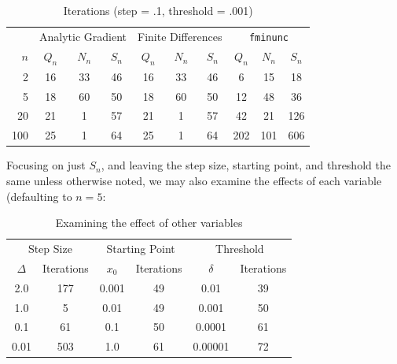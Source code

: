 \documentclass[11pt,letterpaper]{article}
\begin{document}
\begin{table}[h]
\centering
\caption{Iterations (step = .1, threshold = .001)}
\begin{tabular}{r|ccc|ccc|ccc}
   & \multicolumn{3}{|c}{Analytic Gradient} & \multicolumn{3}{|c}{Finite Differences} & \multicolumn{3}{|c}{\texttt{fminunc}} \\
$n$& $Q_n$         & $N_n$        & $S_n$   & $Q_n$              & $N_n$   & $S_n$           & $Q_n$         & $N_n$        & $S_n$ \\\hline
2  & 16            & 33           & 46      & 16                 & 33      & 46              & 6             & 15           & 18    \\
5  & 18            & 60           & 50      & 18                 & 60      & 50              & 12            & 48           & 36    \\
20 & 21            &  1           & 57      & 21                 &  1      & 57              & 42            & 21           & 126   \\
100& 25            &  1           & 64      & 25                 &  1      & 64              & 202           & 101          & 606   
\end{tabular}
\end{table}

Focusing on just $S_n$, and leaving the step size, starting point, and threshold the same unless otherwise noted, we may also examine the effects of each variable (defaulting to $n=5$:

\begin{table}[h]
\centering
\caption{Examining the effect of other variables}
\begin{tabular}{cc|cc|cc}
\multicolumn{2}{c}{Step Size}& \multicolumn{2}{|c}{Starting Point} & \multicolumn{2}{|c}{Threshold} \\
$\Delta$  & Iterations        & $x_0$   & Iterations   & $\delta$  & Iterations     \\\hline
2.0       & 177               & 0.001   & 49           & 0.01      & 39     \\
1.0       & 5                 & 0.01    & 49           & 0.001     & 50     \\
0.1       & 61                & 0.1     & 50           & 0.0001    & 61     \\
0.01      & 503               & 1.0     & 61           & 0.00001   & 72  
\end{tabular}
\end{table}
\end{document}
